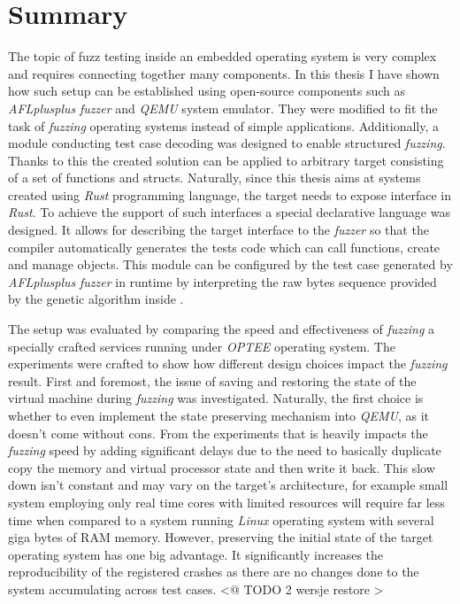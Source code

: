 \cleardoublepage
\section{Summary} \label{chap:summ}
The topic of fuzz testing inside an embedded operating system is very complex and requires connecting together many components. In this thesis I have shown how such setup can be established using open-source components such as \textit{AFLplusplus} \textit{fuzzer} and \textit{QEMU} system emulator. They were modified to fit the task of \textit{fuzzing} operating systems instead of simple applications. Additionally, a module conducting test case decoding was designed to enable structured \textit{fuzzing}. Thanks to this the created solution can be applied to arbitrary target consisting of a set of functions and structs. Naturally, since this thesis aims at systems created using \textit{Rust} programming language, the target needs to expose interface in \textit{Rust}. To achieve the support of such interfaces a special declarative language was designed. It allows for describing the target interface to the \textit{fuzzer} so that the compiler automatically generates the tests code which can call functions, create and manage objects. This module can be configured by the test case generated by \textit{AFLplusplus} \textit{fuzzer} in runtime by interpreting the raw bytes sequence provided by the genetic algorithm inside .

The setup was evaluated by comparing the speed and effectiveness of \textit{fuzzing} a specially crafted services running under \textit{OPTEE} operating system. The experiments were crafted to show how different design choices impact the \textit{fuzzing} result. First and foremost, the issue of saving and restoring the state of the virtual machine during \textit{fuzzing} was investigated. Naturally, the first choice is whether to even implement the state preserving mechanism into \textit{QEMU}, as it doesn't come without cons. From the experiments that is heavily impacts the \textit{fuzzing} speed by adding significant delays due to the need to basically duplicate copy the memory and virtual processor state and then write it back. This slow down isn't constant and may vary on the target's architecture, for example small system employing only real time cores with limited resources will require far less time when compared to a system running \textit{Linux} operating system with several giga bytes of RAM memory. However, preserving the initial state of the target operating system has one big advantage. It significantly increases the reproducibility of the registered crashes as there are no changes done to the system accumulating across test cases. <@ TODO 2 wersje restore > 

